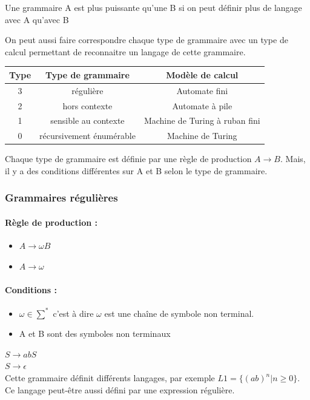 \begin{mydef}
	Une grammaire A est plus puissante qu'une B si on peut définir plus 
	de langage avec A qu'avec B
\end{mydef}

On peut aussi faire correspondre chaque type de grammaire avec un type de 
calcul permettant de reconnaitre un langage de cette grammaire.

\begin{tabular}{|c|c|c|}
	\hline	
	 Type & Type de grammaire & Modèle de calcul\\
	 \hline
	3 & régulière & Automate fini \\
	 \hline
	2 & hors contexte & Automate à pile \\
	 \hline
	1 & sensible au contexte & Machine de Turing à ruban fini \\
	 \hline
	0 & récursivement énumérable & Machine de Turing \\
	\hline
\end{tabular}

Chaque type de grammaire est définie par une règle de production $A\rightarrow 
B$. Mais, il y a des conditions différentes sur A et B selon le type de 
grammaire.

\subsubsection{Grammaires régulières}
\paragraph{Règle de production :} 
\begin{itemize}
	\item $A \rightarrow \omega B$
	\item $A \rightarrow \omega$
\end{itemize}

\paragraph{Conditions :}
\begin{itemize}
	\item  $\omega \in \sum^*$ c'est à dire $\omega$ est une chaîne de symbole non 
	terminal. 
	\item A et B sont des symboles non terminaux
\end{itemize}

\begin{myexem}
	$S \rightarrow abS$ \\
	$S \rightarrow \epsilon$ \\
	Cette grammaire définit différents langages, par exemple $L1 = 
	\{(ab)^n|n \geq 0\}$. Ce langage peut-être aussi défini par une expression 
	régulière.
\end{myexem}

